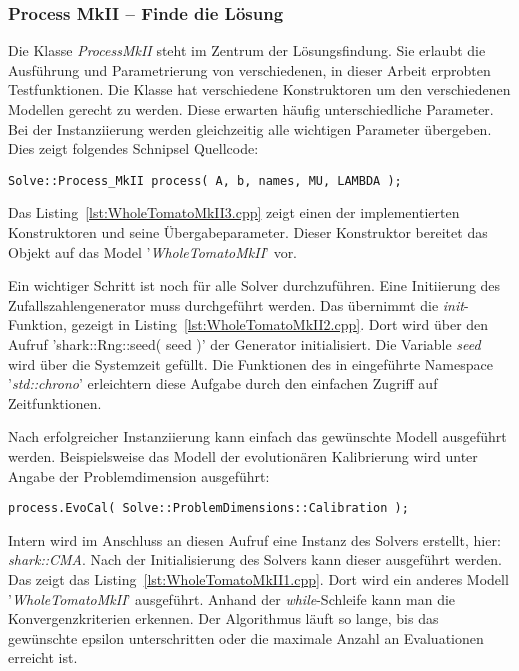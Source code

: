 \subsubsection{Process MkII -- Finde die Lösung}
%
Die Klasse \textit{ProcessMkII} steht im Zentrum der Lösungsfindung. Sie erlaubt die Ausführung und Parametrierung von verschiedenen, in dieser Arbeit erprobten Testfunktionen. Die Klasse hat verschiedene Konstruktoren um den verschiedenen Modellen gerecht zu werden. Diese erwarten häufig unterschiedliche Parameter. Bei der  Instanziierung werden gleichzeitig alle wichtigen Parameter übergeben. Dies zeigt folgendes Schnipsel Quellcode:
%
\begin{lstlisting}[label=InstanceOfProcessMkII]
Solve::Process_MkII	process( A, b, names, MU, LAMBDA );
\end{lstlisting}
%
Das Listing~\ref{lst:WholeTomatoMkII3.cpp} zeigt einen der implementierten Konstruktoren und seine Übergabeparameter. Dieser Konstruktor bereitet das Objekt auf das Model '\textit{WholeTomatoMkII}' vor.
%

%
Ein wichtiger Schritt ist noch für alle Solver durchzuführen. Eine Initiierung des Zufallszahlengenerator muss durchgeführt werden. Das übernimmt die \textit{init}-Funktion, gezeigt in Listing~\ref{lst:WholeTomatoMkII2.cpp}. Dort wird über den Aufruf 'shark::Rng::seed( seed )' der Generator initialisiert. Die Variable \textit{seed} wird über die Systemzeit gefüllt. Die Funktionen des in  eingeführte Namespace '\textit{std::chrono}' erleichtern diese Aufgabe durch den einfachen Zugriff auf Zeitfunktionen.
%

%				
%
Nach erfolgreicher Instanziierung kann einfach das gewünschte Modell ausgeführt werden. Beispielsweise das Modell der evolutionären Kalibrierung wird unter Angabe der Problemdimension ausgeführt:
%
\begin{lstlisting}[label=CallModel]
process.EvoCal( Solve::ProblemDimensions::Calibration );
\end{lstlisting}
%
Intern wird im Anschluss an diesen Aufruf eine Instanz des Solvers erstellt, hier: \textit{shark::CMA}. Nach der Initialisierung des Solvers kann dieser ausgeführt werden. Das zeigt das Listing~\ref{lst:WholeTomatoMkII1.cpp}. Dort wird ein anderes Modell '\textit{WholeTomatoMkII}' ausgeführt. Anhand der \textit{while}-Schleife kann man die Konvergenzkriterien erkennen. Der Algorithmus läuft so lange, bis das gewünschte epsilon unterschritten oder die maximale Anzahl an Evaluationen erreicht ist.
%
%

%
%
